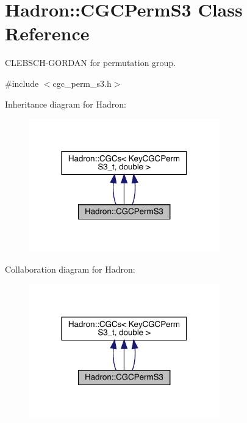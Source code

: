 \hypertarget{classHadron_1_1CGCPermS3}{}\section{Hadron\+:\+:C\+G\+C\+Perm\+S3 Class Reference}
\label{classHadron_1_1CGCPermS3}


C\+L\+E\+B\+S\+C\+H-\/\+G\+O\+R\+D\+AN for permutation group.  




{\ttfamily \#include $<$cgc\+\_\+perm\+\_\+s3.\+h$>$}



Inheritance diagram for Hadron\+:
\nopagebreak
\begin{figure}[H]
\begin{center}
\leavevmode
\includegraphics[width=234pt]{d7/d7f/classHadron_1_1CGCPermS3__inherit__graph}
\end{center}
\end{figure}


Collaboration diagram for Hadron\+:
\nopagebreak
\begin{figure}[H]
\begin{center}
\leavevmode
\includegraphics[width=234pt]{de/dcc/classHadron_1_1CGCPermS3__coll__graph}
\end{center}
\end{figure}
